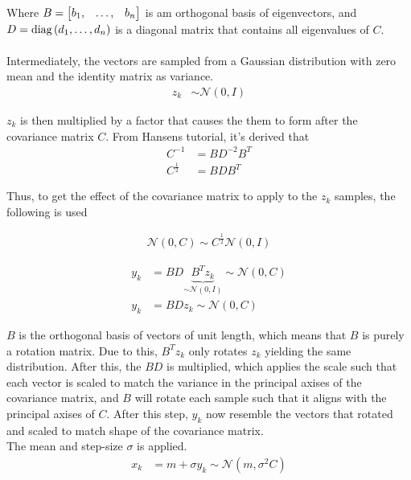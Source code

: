 Where $B = \begin{bmatrix}
b_1, & \dots, & b_n
\end{bmatrix}$ 
is am orthogonal basis of eigenvectors, and  
$D = \text{diag}\left(d_1, \dots, d_n\right)$
is a diagonal matrix that contains all eigenvalues of $C$.\\
\\
Intermediately, the vectors are sampled from a Gaussian distribution 
with zero mean and
the identity matrix as variance.
\begin{align}
z_{k} &\sim \mathcal{N}(0, I)
\end{align}

$z_k$ is then multiplied by a factor that causes the them to form 
after the covariance matrix $C$. From Hansens tutorial, it's derived that
\begin{align}
C^{-1} &= B D^{-2} B^{T}\\
C^{\frac{1}{2}} &= B D B^{T}
\end{align}

Thus, to get the effect of the covariance matrix to apply to the $z_k$
samples, the following is used

\begin{align}
\mathcal{N}\left( 0, C \right) \sim C^{\frac{1}{2}} \mathcal{N}\left( 0, I \right)
\end{align}

\begin{align}
y_{k} &= B D \underbrace{B^{T} z_{k}}_{\sim \mathcal{N}(0, I)} \sim \mathcal{N}(0, C)\\
y_{k} &= B Dz_{k} \sim \mathcal{N}(0, C) \label{eq:sampley}
\end{align}

$B$ is the orthogonal basis of vectors of unit length, which means that 
$B$ is purely a rotation matrix. Due to this, $B^{T} z_{k}$ only rotates
$z_k$ yielding the same distribution. After this, the $BD$ is multiplied,
which applies the scale such that each vector is scaled to match the
variance in the principal axises of the covariance matrix, and $B$ 
will rotate each sample such that it aligns with the principal axises
of $C$. After this step, $y_{k}$ now resemble the vectors that rotated and scaled
to match shape of the covariance matrix.\\

The mean and step-size $\sigma$ is applied.
\begin{align}
x_{k} &= m + \sigma y_{k} \sim \mathcal{N}(m, \sigma^2 C) \label{eq:finalSample}
\end{align}



